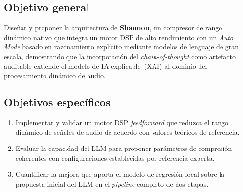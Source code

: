 \documentclass[a4paper,12pt]{article}
\begin{document}
\subsection*{Objetivo general}

Diseñar y proponer la arquitectura de \textbf{Shannon}, un compresor de rango
dinámico nativo que integra un motor DSP de alto rendimiento con un
\textit{Auto Mode} basado en razonamiento explícito mediante modelos de lenguaje
de gran escala, demostrando que la incorporación del \textit{chain-of-thought}
como artefacto auditable extiende el modelo de IA explicable~(XAI) al dominio del
procesamiento dinámico de audio.

\subsection*{Objetivos específicos}

\begin{enumerate}
    \item Implementar y validar un motor DSP \textit{feedforward} que reduzca el
          rango dinámico de señales de audio de acuerdo con valores teóricos de
          referencia.

    \item Evaluar la capacidad del LLM para proponer parámetros de compresión
          coherentes con configuraciones establecidas por referencia experta.

    \item Cuantificar la mejora que aporta el modelo de regresión local
          sobre la propuesta inicial del LLM en el \textit{pipeline} completo de
          dos etapas.
\end{enumerate}
\end{document}
